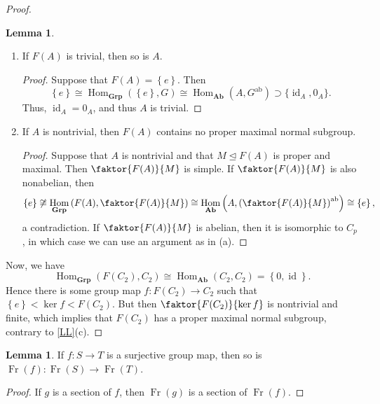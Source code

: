 \documentclass[10pt,letterpaper,cm]{nupset}
\theoremstyle{definition}
\theoremstyle{theorem}
\newtheorem{lemma}[definition]{Lemma}
\theoremstyle{remark}
\newcommand{\1}{\mathbf{1}}
\newcommand{\0}{\vec 0}
\DeclareMathOperator{\id}{\mathrm{id}}
\DeclareMathOperator{\ab}{ab}
\DeclareMathOperator{\Hom}{Hom}
\DeclareMathOperator{\Fr}{Fr}
\begin{document}
\begin{proof}
\begin{lemma}
\begin{enumerate}[label=(\alph*)]
\begin{proof}
On the other hand, if $F(A)$ is simple and abelian, then $F(A) \cong C_p$ for some prime $p$. Set $G = A_{3p}$, so that $G^{\ab} = \left\{e\right\}$. Then  we have $\Hom_{\mathbf{Grp}}(C_p, G) \cong \Hom_{\mathbf{Ab}}(A, \left\{e\right\}) \cong \left\{e\right\}.$ But $C_p \leq G$, so that $\Hom_{\mathbf{Grp}}(C_p, G) $ is nontrivial, a contradiction. 
\end{proof}
\item If $F(A)$ is trivial, then so is $A$.
\begin{proof}
Suppose that $F(A)= \left\{e\right\}$. Then $$\left\{e\right\} \cong \Hom_{\mathbf{Grp}}\left(\left\{e\right\}, G\right) \cong \Hom_{\mathbf{Ab}}\left(A, G^{\ab}\right)\supset \{\id_A, 0_A\}.$$ Thus, $\id_A =0_A$, and thus $A$ is trivial.
\end{proof}
\item If $A$ is nontrivial, then $F(A)$ contains no proper maximal normal subgroup. 
\begin{proof}
Suppose that $A$ is nontrivial and that $M \unlhd F(A)$ is proper and maximal. Then $\faktor{F(A)}{M}$ is simple. If $\faktor{F(A)}{M}$ is also nonabelian, then 
$$\left\{e\right\} \not \cong \Hom_{\mathbf{Grp}}\left(F(A), \faktor{F(A)}{M}\right) \cong \Hom_{\mathbf{Ab}}\left(A, \left(\faktor{F(A)}{M}\right)^{\ab} \right)\cong \left\{e\right\},$$ a contradiction. If $\faktor{F(A)}{M}$ is abelian, then it is isomorphic to $C_p$, in which case we can use an argument as in (a).
\end{proof}
\end{enumerate}
\end{lemma}
Now, we have $$ \Hom_{\mathbf{Grp}}(F(C_2), C_2) \cong \Hom_{\mathbf{Ab}}(C_2, C_2) =\left\{0, \id\right\}.$$  Hence there is some group map $f : F(C_2) \rightarrow C_2$ such that $\left\{e\right\} < \ker{f} < F(C_2)$. But then $\faktor{F(C_2)}{\ker{f}}$ is nontrivial and finite, which implies that $F(C_2)$ has a proper maximal normal subgroup, contrary to \cref{LL}(c). 
\end{proof}

\begin{lemma}
If $f: S \to T$ is a surjective group map, then so is $\Fr(f) : \Fr(S) \to \Fr(T)$.
\end{lemma}
\begin{proof}
If $g$ is a section of $f$, then $\Fr(g)$ is a section of $\Fr(f)$.
\end{proof}
\end{document}
